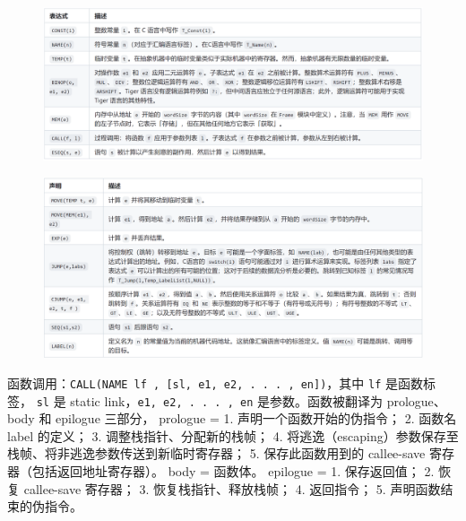 
\begin{figure}[H]
    \centering
    \includegraphics[width=\linewidth]{figures/ir2.png}
\end{figure}

\begin{figure}[H]
    \centering
    \includegraphics[width=\linewidth]{figures/ir1.png}
\end{figure}

\par \noindent 函数调用：\texttt{CALL(NAME lf , [sl, e1, e2, . . . , en])}，其中 \texttt{lf} 是函数标签，
\texttt{sl} 是 static link，\texttt{e1, e2, . . . , en} 是参数。函数被翻译为 prologue、body 和 epilogue 三部分，
prologue = 
1. 声明一个函数开始的伪指令；
2. 函数名 label 的定义；
3. 调整栈指针、分配新的栈帧；
4. 将逃逸（escaping）参数保存至栈帧、将非逃逸参数传送到新临时寄存器；
5. 保存此函数用到的 callee-save 寄存器（包括返回地址寄存器）。
body = 函数体。
epilogue =
1. 保存返回值；
2. 恢复 callee-save 寄存器；
3. 恢复栈指针、释放栈帧；
4. 返回指令；
5. 声明函数结束的伪指令。



